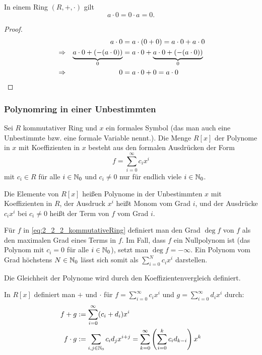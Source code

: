 \begin{bem}
	In einem Ring $ (R,+,\cdot) $ gilt
	\begin{equation}
		a \cdot 0 = 0 \cdot a = 0.
	\end{equation}
\end{bem}
\begin{proof}
	\begin{align*}
		&&a \cdot 0 &= a \cdot (0+0) = a \cdot 0+ a \cdot 0 \\
		&\Rightarrow &\underbrace{a \cdot 0 + (-(a \cdot 0))}_{0} &= a \cdot 0 + \underbrace{a \cdot 0+(-(a \cdot 0))}_{0}\\
		&\Rightarrow & 0 &= a \cdot 0 + 0 = a \cdot 0 \qedhere
	\end{align*}
\end{proof}

\subsubsection{Polynomring in einer Unbestimmten}


Sei $ R $ kommutativer Ring und $ x $ ein formales Symbol (das man auch eine Unbestimmte bzw. eine formale Variable nennt.). Die Menge $R[x]$ der Polynome in $x$ mit Koeffizienten in $x$ besteht aus den formalen Ausdrücken der Form
\begin{equation}
	f = \sum_{i=0}^{\infty} c_{i}x^{i} \label{eq:2_2_2_kommutativeRing}
\end{equation}
 mit $ c_{i} \in R $ für alle $i \in \mathbb N_0$ und $c_i \ne 0$ nur für endlich viele $i \in \mathbb N_0$. 

Die Elemente von $ R[x] $ heißen Polynome in der Unbestimmten $ x $ mit Koeffizienten in $ R $, der Ausdruck $x^i$ heißt Monom vom Grad $i$, und der Ausdrücke $ c_ix^i $ bei $c_i \ne 0$ heißt der Term von $f$ vom Grad $i$. 


Für $ f $ in \eqref{eq:2_2_2_kommutativeRing} definiert man den Grad $\deg f$ von $ f $ als den maximalen Grad eines Terms in $f$. Im Fall, dass $f$ ein Nullpolynom ist (das Polynom mit $c_i =0$ für alle $i \in \mathbb N_0$), setzt man $\deg f = -\infty$. Ein Polynom vom Grad höchstens $N \in \mathbb N_0$ lässt sich somit als $\sum_{i=0}^N c_i x^i$ darstellen. 

Die Gleichheit der Polynome wird durch den Koeffizientenvergleich definiert. 

In $ R[x] $ definiert man $ + $ und $ \cdot $ für $ f = \sum_{i=0}^{\infty} c_{i}x^{i} $ und $ g = \sum_{i=0}^{\infty} d_{i}x^{i} $ durch:
\begin{align}
	f+g &:= \sum_{i=0}^{\infty} (c_{i}+d_{i})x^{i} \\
	f \cdot g &:= \sum_{i,j \in \mathbb N_0} c_i d_j x^{i+j} = \sum_{k=0}^\infty \left( \sum_{i=0}^k c_i d_{k-i} \right) x^k
\end{align}

